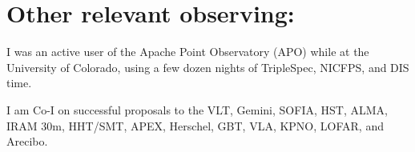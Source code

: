
\section*{Other relevant observing:}
I was an active user of the Apache Point Observatory (APO) while at the
University of Colorado, using a few dozen nights of TripleSpec, NICFPS, and DIS
time.

I am Co-I on successful proposals to the VLT, Gemini, SOFIA, HST, ALMA, IRAM
30m, HHT/SMT, APEX, Herschel, GBT, VLA, KPNO, LOFAR, and Arecibo.  

